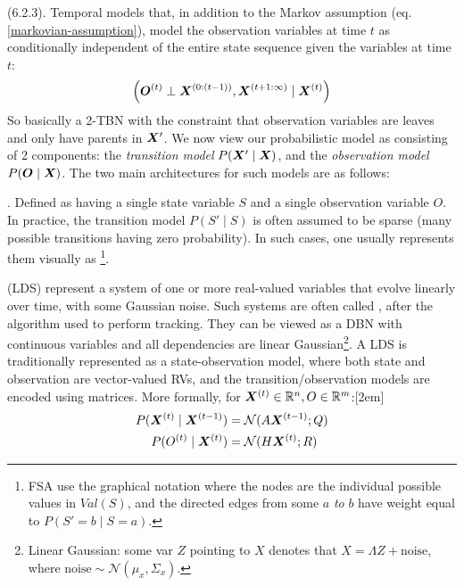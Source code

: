 \documentclass[11pt]{article}
\begin{document}
\myspace
\p {} (6.2.3). Temporal models that, in addition to the Markov assumption (eq. \ref{markovian-assumption}), model the observation variables at time $t$ as conditionally independent of the entire state sequence given the variables at time $t$:
\begin{align}
	\left( 
		\bm{O}_{}^{(t)} \perp \bm{X}_{}^{(0:(t-1))}, \bm{X}_{}^{(t+1:\infty)}
		\mid
		\bm{X}_{}^{(t)}
	\right)
\end{align}
So basically a 2-TBN with the constraint that observation variables are leaves and only have parents in $\bm{X}_{}'$. We now view our probabilistic model as consisting of 2 components: the \textit{transition model} $P(\bm{X}_{}' \mid \bm{X}_{})$, and the \textit{observation model} $P(\bm{O}_{} \mid \bm{X}_{})$. The two main architectures for such models are as follows:
\begin{compactitem}
	\item {}. Defined as having a single state variable $S$ and a single observation variable $O$. In practice, the transition model $P(S' \mid S)$ is often assumed to be sparse (many possible transitions having zero probability). In such cases, one usually represents them visually as \footnote{FSA use the graphical notation where the nodes are the individual possible values in $Val(S)$, and the directed edges from some $a$ \textit{to} $b$ have weight equal to $P(S'=b \mid S=a)$.}.
	
	\item {} (LDS) represent a system of one or more real-valued variables that evolve linearly over time, with some Gaussian noise. Such systems are often called , after the algorithm used to perform tracking. They can be viewed as a DBN with continuous variables and all dependencies are linear Gaussian\footnote{Linear Gaussian: some var $Z$ pointing to $X$ denotes that $X = \Lambda Z + \text{noise}$, where $\text{noise} \sim \mathcal{N}(\mu_x, \Sigma_x)$.}. A LDS is traditionally represented as a state-observation model, where both state and observation are vector-valued RVs, and the transition/observation models are encoded using matrices. More formally, for $\bm{X}_{}^{(t)} \in \mathbb{R}^n, O \in \mathbb{R}^m$:[2em]
	\begin{align}
		P(\bm{X}_{}^{(t)} \mid \bm{X}_{}^{(t-1)})
			&= \mathcal{N}(A \bm{X}_{}^{(t-1)}; Q) \\
		P(O^{(t)} \mid \bm{X}_{}^{(t)}) 
			&= \mathcal{N}(H \bm{X}_{}^{(t)}; R)
	\end{align}
\end{compactitem}
\end{document}
